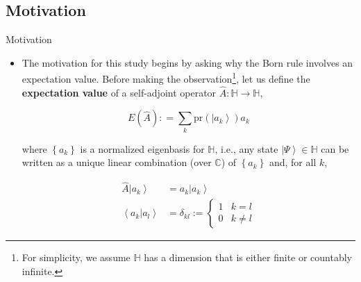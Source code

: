 \documentclass[9pt,handout]{beamer}
\newcommand{\pr}[0]{\text{pr}}
\begin{document}
\subsection{Motivation}
\begin{frame}{Motivation}
\begin{itemize}
\item The motivation for this study begins by asking why the Born rule involves an expectation value. Before making the observation\footnote{For simplicity, we assume $\mathbb{H}$ has a dimension that is either finite or countably infinite.}, let us define the \textbf{expectation value} of a self-adjoint operator $\widehat{A} : \mathbb{H} \to \mathbb{H}$,

$$E \left( \widehat{A} \right) : = \sum_{k} \pr \left( \left\lvert a_k \right\rangle \right) a_k$$

where $\left\{ a_k \right\}$ is a normalized eigenbasis for $\mathbb{H}$, i.e., any state $\left\lvert \Psi \right\rangle \in \mathbb{H}$ can be written as a unique linear combination (over $\mathbb{C}$) of $\left\{ a_k \right\}$ and, for all $k$,

\begin{align*}
\widehat{A} \left\lvert a_k \right\rangle & = a_k \left\lvert a_k \right\rangle \\
\left\langle \left. a_k \right\rvert a_l \right\rangle & = \delta_{k l} := \begin{cases} 
1 & k = l \\
0 & k \neq l
\end{cases}
\end{align*}
\end{itemize}
\end{frame}
\end{document}
